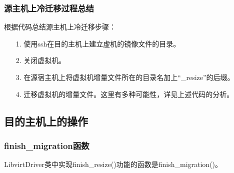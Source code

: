 \documentclass[a4paper,left=1.5cm,right=1.5cm,11pt]{article}
\begin{document}
\subsubsection{源主机上冷迁移过程总结}
	根据代码总结源主机上冷迁移步骤：
	\begin{itemize}
		\item[1.] 使用ssh在目的主机上建立虚机的镜像文件的目录。
		\item[2.] 关闭虚拟机。
		\item[3.] 在源宿主机上将虚拟机增量文件所在的目录名加上“\_resize”的后缀。
		\item[4.] 迁移虚拟机的增量文件。这里有多种可能性，详见上述代码的分析。
	\end{itemize}

\clearpage

\subsection{目的主机上的操作}
\subsubsection{finish\_migration函数}
	LibvirtDriver类中实现finish\_resize()功能的函数是finish\_migration()。\par
\end{document}
